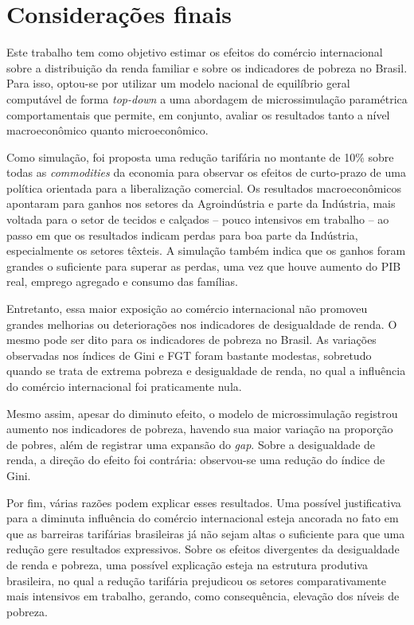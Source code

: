 

\chapter{Considerações finais}

Este trabalho tem como objetivo estimar os efeitos do comércio internacional sobre a distribuição da renda familiar e sobre os indicadores de pobreza no Brasil. Para isso, optou-se por utilizar um modelo nacional de equilíbrio geral computável de forma \textit{top-down} a uma abordagem de microssimulação paramétrica comportamentais que permite, em conjunto, avaliar os resultados tanto a nível macroeconômico quanto microeconômico.

Como simulação, foi proposta uma redução tarifária no montante de 10\% sobre todas as \textit{commodities} da economia para observar os efeitos de curto-prazo de uma política orientada para a liberalização comercial. Os resultados macroeconômicos apontaram para ganhos nos setores da Agroindústria e parte da Indústria, mais voltada para o setor de tecidos e calçados -- pouco intensivos em trabalho -- ao passo em que os resultados indicam perdas para boa parte da Indústria, especialmente os setores têxteis. A simulação também indica que os ganhos foram grandes o suficiente para superar as perdas, uma vez que houve aumento do PIB real, emprego agregado e consumo das famílias.

Entretanto, essa maior exposição ao comércio internacional não promoveu grandes melhorias ou deteriorações nos indicadores de desigualdade de renda. O mesmo pode ser dito para os indicadores de pobreza no Brasil. As variações observadas nos índices de Gini e FGT foram bastante modestas, sobretudo quando se trata de extrema pobreza e desigualdade de renda, no qual a influência do comércio internacional foi praticamente nula.

Mesmo assim, apesar do diminuto efeito, o modelo de microssimulação registrou aumento nos indicadores de pobreza, havendo sua maior variação na proporção de pobres, além de registrar uma expansão do \textit{gap}. Sobre a desigualdade de renda, a direção do efeito foi contrária: observou-se uma redução do índice de Gini.

Por fim, várias razões podem explicar esses resultados. Uma possível justificativa para a diminuta influência do comércio internacional esteja ancorada no fato em que as barreiras tarifárias brasileiras já não sejam altas o suficiente para que uma redução gere resultados expressivos. Sobre os efeitos divergentes da desigualdade de renda e pobreza, uma possível explicação esteja na estrutura produtiva brasileira, no qual a redução tarifária prejudicou os setores comparativamente mais intensivos em trabalho, gerando, como consequência, elevação dos níveis de pobreza.

